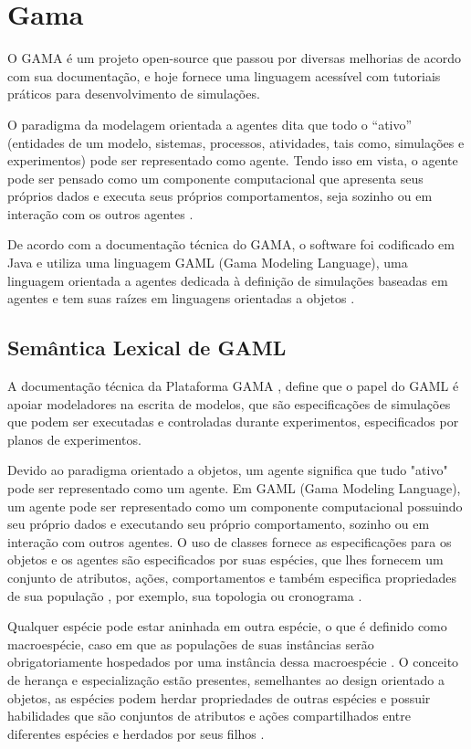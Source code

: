 \section{Gama}

O GAMA é um projeto open-source que passou por diversas melhorias de acordo com sua documentação, e hoje fornece uma linguagem acessível com tutoriais práticos para desenvolvimento de simulações. 

O paradigma da modelagem orientada a agentes dita que todo o “ativo” (entidades de um modelo, sistemas, processos, atividades, tais como, simulações e experimentos) pode ser representado como agente. Tendo isso em vista, o agente pode ser pensado como um componente computacional que apresenta seus próprios dados e executa seus próprios comportamentos, seja sozinho ou em interação com os outros agentes \cite{gamaplataform}. 

De acordo com a documentação técnica do GAMA, o software foi codificado em Java e utiliza uma linguagem GAML (Gama Modeling Language), uma linguagem orientada a agentes dedicada à definição de simulações baseadas em agentes e tem suas raízes em linguagens orientadas a objetos \cite{gamaplataform}.  


\subsection{Semântica Lexical de GAML}

A documentação técnica da Plataforma GAMA \cite{gamaplataform}, define que o papel do GAML é apoiar modeladores na escrita de modelos, que são especificações de simulações que podem ser executadas e controladas durante experimentos, especificados por planos de experimentos.

Devido ao paradigma orientado a objetos, um agente significa que tudo "ativo" pode ser representado como um agente. Em GAML (Gama Modeling Language), um agente pode ser representado como um componente computacional possuindo seu próprio dados e executando seu próprio comportamento, sozinho ou em interação com outros agentes. O uso de classes fornece as especificações para os objetos e os agentes são especificados por suas espécies, que lhes fornecem um conjunto de atributos, ações, comportamentos e também especifica propriedades de sua população , por exemplo, sua topologia ou cronograma \cite{gamaplataform}.

Qualquer espécie pode estar aninhada em outra espécie, o que é definido como macroespécie, caso em que as populações de suas instâncias serão obrigatoriamente hospedados por uma instância dessa macroespécie \cite{gamaplataform}. O conceito de herança e especialização estão presentes, semelhantes ao design orientado a objetos, as espécies podem herdar propriedades de outras espécies e possuir habilidades que são conjuntos de atributos e ações compartilhados entre diferentes espécies e herdados por seus filhos \cite{gamaplataform}.

